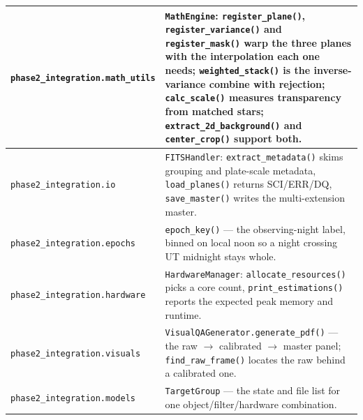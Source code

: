 \documentclass[11pt,a4paper]{article}
\begin{document}
\begin{center}
\begin{longtable}{|p{3.6cm}|p{10.9cm}|}
\hline
\texttt{phase2\_integration.\allowbreak math\_utils} & \texttt{MathEngine}: \texttt{register\_plane()}, \texttt{register\_variance()} and \texttt{register\_mask()} warp the three planes with the interpolation each one needs; \texttt{weighted\_stack()} is the inverse-variance combine with rejection; \texttt{calc\_scale()} measures transparency from matched stars; \texttt{extract\_2d\_background()} and \texttt{center\_crop()} support both. \\
\hline
\texttt{phase2\_integration.io} & \texttt{FITSHandler}: \texttt{extract\_metadata()} skims grouping and plate-scale metadata, \texttt{load\_planes()} returns SCI/ERR/DQ, \texttt{save\_master()} writes the multi-extension master. \\
\hline
\texttt{phase2\_integration.\allowbreak epochs} & \texttt{epoch\_key()} --- the observing-night label, binned on local noon so a night crossing UT midnight stays whole. \\
\hline
\texttt{phase2\_integration.\allowbreak hardware} & \texttt{HardwareManager}: \texttt{allocate\_resources()} picks a core count, \texttt{print\_estimations()} reports the expected peak memory and runtime. \\
\hline
\texttt{phase2\_integration.\allowbreak visuals} & \texttt{VisualQAGenerator.generate\_pdf()} --- the raw $\rightarrow$ calibrated $\rightarrow$ master panel; \texttt{find\_raw\_frame()} locates the raw behind a calibrated one. \\
\hline
\texttt{phase2\_integration.\allowbreak models} & \texttt{TargetGroup} --- the state and file list for one object/filter/hardware combination. \\
\hline
\end{longtable}
\end{center}
\end{document}
